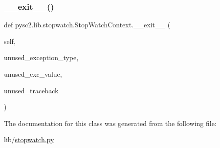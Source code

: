 \mbox{\label{classpysc2_1_1lib_1_1stopwatch_1_1_stop_watch_context_ac60f1449ee817c0fccf36816828f5c5b}} 
\subsubsection{\texorpdfstring{\+\_\+\+\_\+exit\+\_\+\+\_\+()}{\_\_exit\_\_()}}
{\footnotesize\ttfamily def pysc2.\+lib.\+stopwatch.\+Stop\+Watch\+Context.\+\_\+\+\_\+exit\+\_\+\+\_\+ (\begin{DoxyParamCaption}\item[{}]{self,  }\item[{}]{unused\+\_\+exception\+\_\+type,  }\item[{}]{unused\+\_\+exc\+\_\+value,  }\item[{}]{unused\+\_\+traceback }\end{DoxyParamCaption})}



The documentation for this class was generated from the following file\+:\begin{DoxyCompactItemize}
\item 
lib/\mbox{\hyperlink{stopwatch_8py}{stopwatch.\+py}}\end{DoxyCompactItemize}
